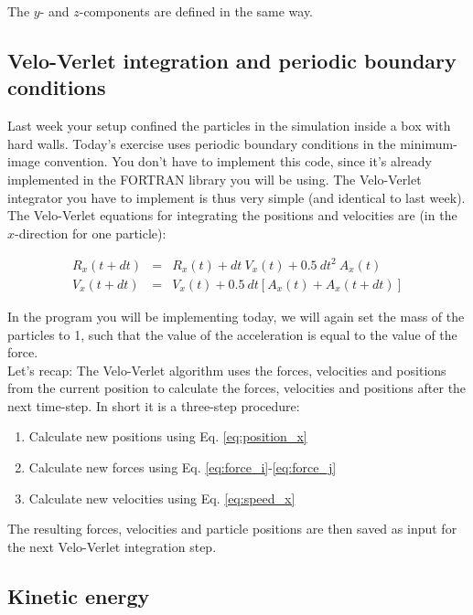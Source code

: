 \documentclass{article}
\begin{document}
The $y$- and $z$-components are defined in the same way.

\subsection{Velo-Verlet integration and periodic boundary conditions}

Last week your setup confined the particles in the simulation inside a box with hard walls.
Today's exercise uses periodic boundary conditions in the minimum-image convention.
%
You don't have to implement this code, since it's already implemented in the FORTRAN library you will be using.
The Velo-Verlet integrator you have to implement is thus very simple (and identical to last week).
The Velo-Verlet equations for integrating the positions and velocities are (in the $x$-direction for one particle):

\begin{eqnarray}
    R_x(t + dt) &=& R_x(t) + dt\ V_x(t) + 0.5\ dt^2\ A_x(t) \label{eq:position_x}\\
    V_x(t + dt) &=& V_x(t) + 0.5\ dt \left[A_x(t) + A_x(t+dt)\right] \label{eq:speed_x}
\end{eqnarray}

In the program you will be implementing today, we will again set the mass of the particles to 1, such that the value of the acceleration is equal to the value of the force.\\

Let's recap: The Velo-Verlet algorithm uses the forces, velocities and positions from the current position to calculate the forces, velocities and positions after the next time-step.
In short it is a three-step procedure:

\begin{enumerate}
    \item Calculate new positions using Eq. \ref{eq:position_x}
    \item Calculate new forces using Eq. \ref{eq:force_i}-\ref{eq:force_j}
    \item Calculate new velocities using Eq. \ref{eq:speed_x}
\end{enumerate}

The resulting forces, velocities and particle positions are then saved as input for the next Velo-Verlet integration step.

\subsection{Kinetic energy}
\end{document}
